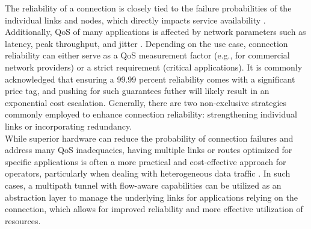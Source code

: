 The reliability of a connection is closely tied to the failure probabilities of the individual links and nodes, which directly impacts service availability \cite{shooman_algorithms_1995}. 
Additionally, \ac{QoS} of many applications is affected by network parameters such as latency, peak throughput, and jitter \cite{gozdecki_quality_2003}.
Depending on the use case, connection reliability can either serve as a \ac{QoS} measurement factor (e.g., for commercial network providers) or a strict requirement (critical applications). 
It is commonly acknowledged that ensuring a 99.99 percent reliability comes with a significant price tag, and pushing for such guarantees futher will likely result in an exponential cost escalation.
Generally, there are two non-exclusive strategies commonly employed to enhance connection reliability: strengthening individual links or incorporating redundancy.
\\

While superior hardware can reduce the probability of connection failures and address many \ac{QoS} inadequacies, having multiple links or routes optimized for specific applications is often a more practical and cost-effective approach for operators, particularly when dealing with heterogeneous data traffic \cite{chen_overview_1998}.
In such cases, a multipath tunnel with flow-aware capabilities can be utilized as an abstraction layer to manage the underlying links for applications relying on the connection, which allows for improved reliability and more effective utilization of resources. 






